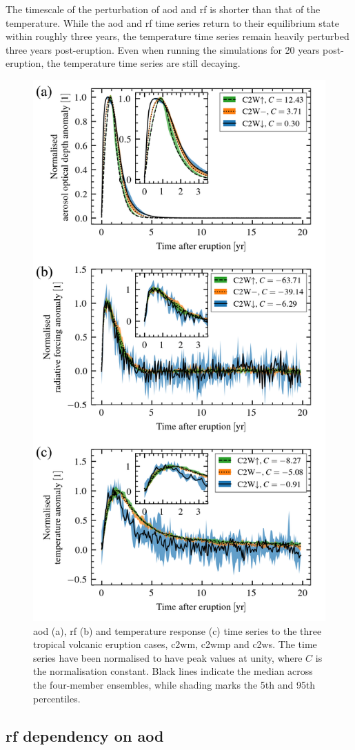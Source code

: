 \documentclass{ametsocV6.1}
\begin{document}
The timescale of the perturbation of \gls{aod} and \gls{rf} is shorter than that of the
temperature. While the \gls{aod} and \gls{rf} time series return to their equilibrium
state within roughly three years, the temperature time series remain heavily perturbed
three years post-eruption. Even when running the simulations for 20 years post-eruption,
the temperature time series are still decaying.

\begin{figure}
  \centering
  \includegraphics[width=0.5\linewidth]{figures/figure1.png}

  \caption{\gls{aod} (a), \gls{rf} (b) and temperature response (c) time series to the
    three tropical volcanic eruption cases, \gls{c2wm}, \gls{c2wmp} and \gls{c2ws}. The time
    series have been normalised to have peak values at unity, where \(C\) is the
    normalisation constant. Black lines indicate the median across the four-member
    ensembles, while shading marks the 5th and 95th
    percentiles.}\label{fig:1_compare_waveform}%
\end{figure}

\subsection{\gls{rf} dependency on \gls{aod}}
\end{document}
